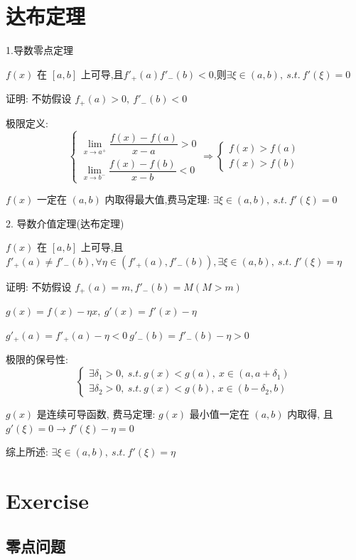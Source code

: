 \section{达布定理}
\begin{theorem}
	1.导数零点定理

	$f(x)$ 在 $[a,b]$ 上可导,且$f'_{+}(a)f'_{-}(b)<0$,则$\exists \xi\in(a,b),\ s.t.\ f'(\xi)=0$

	证明: 不妨假设 $f_{+}(a)>0,\ f'_{-}(b)<0$

	极限定义:
	$$\begin{cases}
		\lim\limits_{x\rightarrow a^{+}}\dfrac{f(x)-f(a)}{x-a}>0 \\
		\lim\limits_{x\rightarrow b^{-}}\dfrac{f(x)-f(b)}{x-b}<0
	\end{cases}\Rightarrow
	\begin{cases}
		f(x)>f(a) \\
		f(x)>f(b)
	\end{cases}$$

	$f(x)$ 一定在 $(a,b)$ 内取得最大值,费马定理: $\exists \xi\in(a,b),\ s.t.\ f'(\xi)=0$

	2. 导数介值定理(达布定理)

	$f(x)$ 在 $[a,b]$ 上可导,且 $f'_{+}(a)\neq f'_{-}(b),\forall \eta \in (f'_{+}(a),f'_{-}(b)),\exists \xi\in(a,b),\ s.t.\ f'(\xi)=\eta$

	证明: 不妨假设 $f_{+}(a)=m, f'_{-}(b)=M(M>m)$

	$g(x)=f(x)-\eta x,\ g'(x)=f'(x)-\eta$

	$g'_{+}(a)=f'_{+}(a)-\eta<0\ g'_{-}(b)=f'_{-}(b)-\eta>0$

	极限的保号性:
	$$\begin{cases}
		\exists \delta_{1}>0,\ s.t.\ g(x)<g(a),\ x\in(a,a+\delta_{1}) \\
		\exists \delta_{2}>0,\ s.t.\ g(x)<g(b),\ x\in(b-\delta_{2},b)
	\end{cases}$$

	$g(x)$ 是连续可导函数, 费马定理: $g(x)$ 最小值一定在 $(a,b)$ 内取得, 且 $g'(\xi)=0\to f'(\xi) -\eta =0$

	综上所述: $\exists \xi\in(a,b),\ s.t.\ f'(\xi)=\eta$
\end{theorem}
\section{Exercise}

\subsection{零点问题}

